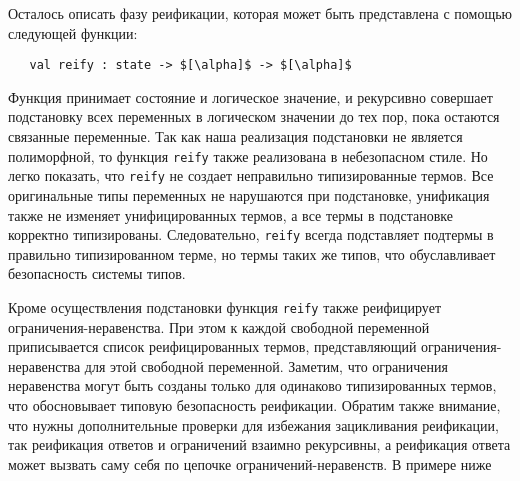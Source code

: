 
Осталось описать фазу реификации, которая может быть представлена с помощью следующей функции:

\begin{lstlisting}
   val reify : state -> $[\alpha]$ -> $[\alpha]$
\end{lstlisting}

Функция принимает состояние и логическое значение, и рекурсивно совершает подстановку всех переменных в логическом значении до тех пор, пока остаются связанные переменные. Так как наша реализация подстановки не является полиморфной, то функция \lstinline|reify| также реализована в небезопасном стиле.
Но легко показать, что \lstinline|reify| не создает неправильно типизированные термов. Все оригинальные типы переменных не нарушаются при подстановке, унификация также не изменяет унифицированных термов, а все термы в подстановке корректно типизированы.
Следовательно, \lstinline|reify| всегда подставляет подтермы в правильно типизированном терме, но термы таких же типов, что обуславливает безопасность системы типов.


Кроме осуществления подстановки функция  \lstinline|reify| также реифицирует ограничения-неравенства.
При этом к каждой свободной переменной приписывается список реифицированных термов, представляющий ограничения-неравенства для этой свободной переменной.
Заметим, что ограничения неравенства могут быть созданы только для одинаково типизированных термов, что обосновывает типовую безопасность реификации.
Обратим также внимание, что нужны дополнительные проверки для избежания зацикливания реификации, так реификация ответов и ограничений взаимно рекурсивны, а реификация ответа может вызвать саму себя по цепочке ограничений-неравенств. В примере ниже

